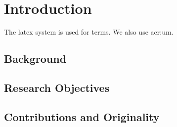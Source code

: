 \documentclass{umphdthesis}
\begin{document}
\umphdfrontmatter

\begin{umphdacknowledgements}
\lipsum[1-2]
\end{umphdacknowledgements}

\begin{umphdabstract}
\lipsum[1-2]
\end{umphdabstract}

\begin{umphddeclaration}
\end{umphddeclaration}

\makeatletter
\@openrightfalse
\makeatother
\tableofcontents

\umphdlistoffiguresandtables

\begin{umphdglossary}
\end{umphdglossary}

\begin{umphdabbreviations}
\end{umphdabbreviations}

\umphdmainmatter

\chapter{Introduction}

The \gls{latex} system is used for \glspl{term}.
We also use \gls{acr:um}.

\section{Background}

\lipsum[1-2]

\section{Research Objectives}

\lipsum[1-2]

\section{Contributions and Originality}
\end{document}

